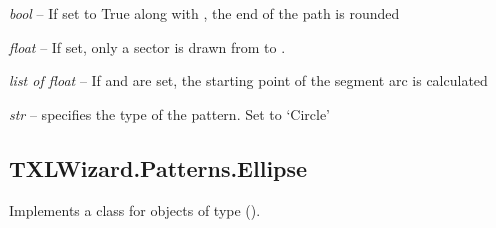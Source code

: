 \documentclass[letterpaper,10pt,english]{sphinxmanual}
\begin{document}
\begin{fulllineitems}
\begin{fulllineitems}
\end{fulllineitems}


\begin{fulllineitems}
\label{Chapters/PythonModuleReference/Patterns/TXLWizard.Patterns.Circle:TXLWizard.Patterns.Circle.Circle.RoundCaps}
\emph{bool} -- If set to True along with , the end of the path is rounded

\end{fulllineitems}


\begin{fulllineitems}
\label{Chapters/PythonModuleReference/Patterns/TXLWizard.Patterns.Circle:TXLWizard.Patterns.Circle.Circle.StartAngle}
\emph{float} -- If set, only a sector is drawn from  to .

\end{fulllineitems}


\begin{fulllineitems}
\label{Chapters/PythonModuleReference/Patterns/TXLWizard.Patterns.Circle:TXLWizard.Patterns.Circle.Circle.StartPoint}
\emph{list of float} -- If  and  are set, the starting point of the segment arc is calculated

\end{fulllineitems}


\begin{fulllineitems}
\label{Chapters/PythonModuleReference/Patterns/TXLWizard.Patterns.Circle:TXLWizard.Patterns.Circle.Circle.Type}
\emph{str} -- specifies the type of the pattern. Set to `Circle'

\end{fulllineitems}


\end{fulllineitems}



\subsection{TXLWizard.Patterns.Ellipse}
\label{Chapters/PythonModuleReference/Patterns/TXLWizard.Patterns.Ellipse:txlwizard-patterns-ellipse}\label{Chapters/PythonModuleReference/Patterns/TXLWizard.Patterns.Ellipse:module-TXLWizard.Patterns.Ellipse}\label{Chapters/PythonModuleReference/Patterns/TXLWizard.Patterns.Ellipse::doc}
Implements a class for  objects of type  ().
\end{document}
